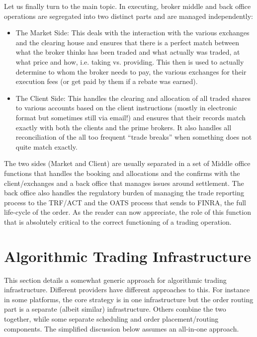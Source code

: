 Let us finally turn to the main topic. In executing, broker middle and back office operations are segregated into two distinct parts and are managed independently: 
        \begin{itemize}
        \item The Market Side: This deals with the interaction with the various exchanges  and the clearing house and ensures that there is a perfect match between what the broker thinks has been traded and what actually was traded, at what price and how, i.e. taking vs. providing. This then is used to actually determine to whom the broker needs to pay, the various exchanges for their execution fees (or get paid by them if a rebate was earned).
        \item The Client Side: This handles the clearing and allocation of all traded shares to various accounts based on the client instructions (mostly in electronic format but sometimes still via email!) and ensures that their records match exactly with both the clients and the prime brokers. It also handles all reconciliation of the all too frequent ``trade breaks'' when something does not quite match exactly.
        \end{itemize}


The two sides (Market and Client) are usually separated in a set of Middle office functions that handles the booking and allocations and the confirms with the client/exchanges and a back office that manages issues around settlement. The back office also handles the regulatory burden of managing the trade reporting process to the TRF/ACT and the OATS process that sends to FINRA, the full life-cycle of the order. As the reader can now appreciate, the role of this function that is absolutely critical to the correct functioning of a trading operation.



\section{Algorithmic Trading Infrastructure\label{sec:alg_trad_infra}}\label{in:trad_infr3}

This section details a somewhat generic approach for algorithmic trading infrastructure. Different providers have different approaches to this. For instance in some platforms, the core strategy is in one infrastructure but the order routing part is a separate (albeit similar) infrastructure. Others combine the two together, while some separate scheduling and order placement/routing components. The simplified discussion below assumes an all-in-one approach.

